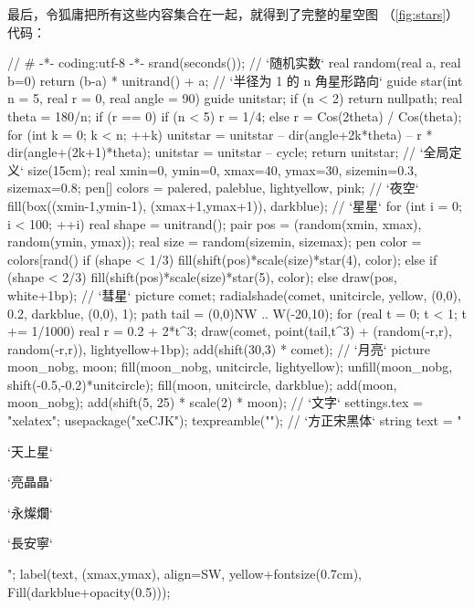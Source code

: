 最后，令狐庸把所有这些内容集合在一起，就得到了完整的星空图
（\autoref{fig:stars}）代码：
\begin{asycode}
// # -*- coding:utf-8 -*-
srand(seconds());
// `\color{comment}随机实数`
real random(real a, real b=0)
{
    return (b-a) * unitrand() + a;
}
// `\color{comment}半径为 1 的 n 角星形路向`
guide star(int n = 5, real r = 0, real angle = 90)
{
    guide unitstar;
    if (n < 2) return nullpath;
    real theta = 180/n;
    if (r == 0) {
        if (n < 5)
            r = 1/4;
        else
            r = Cos(2theta) / Cos(theta);
    }
    for (int k = 0; k < n; ++k)
        unitstar = unitstar -- dir(angle+2k*theta) -- r * dir(angle+(2k+1)*theta);
    unitstar = unitstar -- cycle;
    return unitstar;
}
// `\color{comment}全局定义`
size(15cm);
real xmin=0, ymin=0, xmax=40, ymax=30, sizemin=0.3, sizemax=0.8;
pen[] colors = {palered, paleblue, lightyellow, pink};
// `\color{comment}夜空`
fill(box((xmin-1,ymin-1), (xmax+1,ymax+1)), darkblue);
// `\color{comment}星星`
for (int i = 0; i < 100; ++i) {
    real shape = unitrand();
    pair pos = (random(xmin, xmax), random(ymin, ymax));
    real size = random(sizemin, sizemax);
    pen color = colors[rand() %
    if (shape < 1/3)
        fill(shift(pos)*scale(size)*star(4), color);
    else if (shape < 2/3)
        fill(shift(pos)*scale(size)*star(5), color);
    else
        draw(pos, white+1bp);
}
// `\color{comment}彗星`
picture comet;
radialshade(comet, unitcircle,
            yellow, (0,0), 0.2,
            darkblue, (0,0), 1);
path tail = (0,0){NW} .. {W}(-20,10);
for (real t = 0; t < 1; t += 1/1000) {
    real r = 0.2 + 2*t^3;
    draw(comet, point(tail,t^3) + (random(-r,r), random(-r,r)),
         lightyellow+1bp);
}
add(shift(30,3) * comet);
// `\color{comment}月亮`
picture moon_nobg, moon;
fill(moon_nobg, unitcircle, lightyellow);
unfill(moon_nobg, shift(-0.5,-0.2)*unitcircle);
fill(moon, unitcircle, darkblue);
add(moon, moon_nobg);
add(shift(5, 25) * scale(2) * moon);
// `\color{comment}文字`
settings.tex = "xelatex";
usepackage("xeCJK");
texpreamble(""); // `\color{comment}方正宋黑体`
string text = "\begin{minipage}{3em}
`\color{string}天上星`\par
`\color{string}亮晶晶`\par
`\color{string}永燦爛`\par
`\color{string}長安寧`
\end{minipage}";
label(text, (xmax,ymax), align=SW, yellow+fontsize(0.7cm),
      Fill(darkblue+opacity(0.5)));  
\end{asycode}


